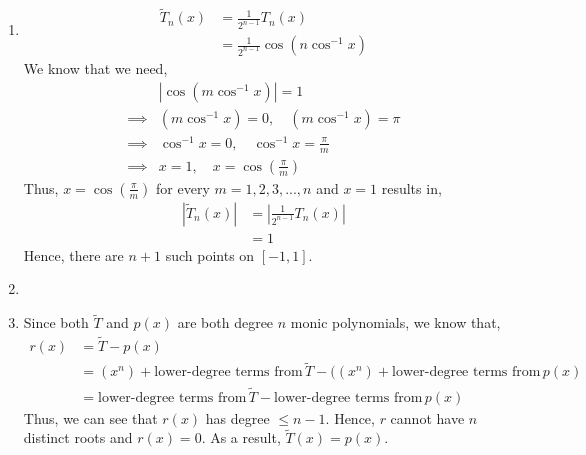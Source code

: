 \documentclass[12pt]{article}
\newenvironment{problem}[2][Problem]{\begin{trivlist}
\item[\hskip \labelsep {\bfseries #1}\hskip \labelsep {\bfseries #2.}]}{\end{trivlist}}
\begin{document}
\begin{enumerate}
	\item[a)] 
	\begin{align*}
		\widetilde{T}_n(x) &= \frac{1}{2^{n-1}}T_n(x)\\
		&= \frac{1}{2^{n-1}}\cos(n\cos^{-1}x)
	\end{align*}
	We know that we need,
	\begin{align*}
		&\left|\cos(m\cos^{-1}x)\right| = 1\\
		\implies &(m\cos^{-1}x) = 0, \quad (m\cos^{-1}x) = \pi\\
		\implies &\cos^{-1}x = 0, \quad \cos^{-1}x = \frac{\pi}{m}\\
		\implies &x = 1, \quad x = \cos\left(\frac{\pi}{m}\right)
	\end{align*}
	Thus, $x = \cos(\frac{\pi}{m})$ for every $m = 1, 2, 3, ..., n$ and $x = 1$ results in, 
	\begin{align*}
		\left|\widetilde{T}_n(x)\right| &= \left|\frac{1}{2^{n-1}}T_n(x)\right|\\
		&= 1
	\end{align*}
	Hence, there are $n + 1$ such points on $[-1, 1]$.
	\item[b)]
	\item[c)] Since both $\widetilde{T}$ and $p(x)$ are both degree $n$ monic polynomials, we know that,
	\begin{align*}
		r(x) &= \widetilde{T} - p(x)\\
		&= (x^n) + \text{lower-degree terms from} \, \widetilde{T} - ((x^n) + \text{lower-degree terms from} \, p(x)\\
		&= \text{lower-degree terms from} \, \widetilde{T} - \text{lower-degree terms from} \, p(x)
	\end{align*}
	Thus, we can see that $r(x)$ has degree $\leq n-1$. Hence, $r$ cannot have $n$ distinct roots and $r(x) = 0$. As a result, $\widetilde{T}(x) = p(x)$.
\end{enumerate}

\begin{problem}{3}
\end{problem}
\end{document}
